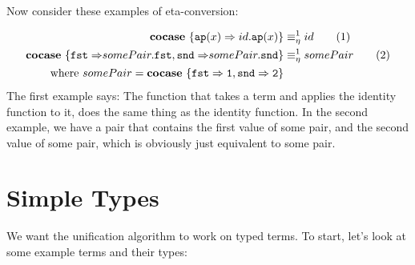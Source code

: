 \documentclass[twoside,12pt,a4paper]{article}
\begin{document}
Now consider these examples of eta-conversion:
\begin{example}
    \begin{align*}
        \textbf{cocase}\ \{\texttt{ap}(x)\Rightarrow id.\texttt{ap}(x)\}&\equiv_{\eta}^1 id\tag{1}\\
        \textbf{cocase}\ \{\mathtt{fst\Rightarrow} somePair.\mathtt{fst}, \mathtt{snd\Rightarrow}somePair.\mathtt{snd}\}&\equiv_{\eta}^1 somePair \tag{2}\\      
        \text{where } somePair = \textbf{cocase}\ \{\mathtt{fst\Rightarrow 1, snd\Rightarrow 2}\}
    \end{align*} 
    The first example says: The function that takes a term and applies the identity function to it, does the same thing as the identity function.
    In the second example, we have a pair that contains the first value of some pair, and the second value of some pair, which is obviously just equivalent to some pair.    
\end{example}    
    
\section{Simple Types}\label{sec:Simple Types}

We want the unification algorithm to work on typed terms. 
To start, let's look at some example terms and their types:
\end{document}

